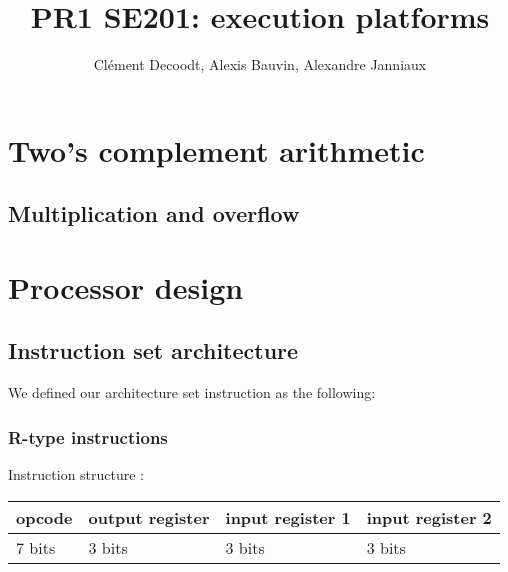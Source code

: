 \documentclass[a4paper]{report}
\author{Clément Decoodt, Alexis Bauvin, Alexandre Janniaux}
\title{PR1 SE201: execution platforms}
\begin{document}
\maketitle

\section{Two's complement arithmetic}

\subsection{}

\subsection{}

\subsection{}

\subsection{Multiplication and overflow}

\section{Processor design}

\subsection{Instruction set architecture}

We defined our architecture set instruction as the following:

\subsubsection{R-type instructions}

Instruction structure :

\begin{center}
	\begin{tabular}{|l|l|l|l|}
		\hline
		opcode & output register & input register 1 & input register 2 \\
		\hline
		7 bits & 3 bits & 3 bits & 3 bits \\
		\hline
	\end{tabular}
\end{center}
\end{document}
